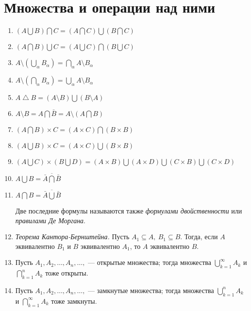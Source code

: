\documentclass[a4paper,12pt]{scrartcl}
\begin{document}
\section{Множества и операции над ними}
\begin{enumerate}
\item $(A \bigcup B)\bigcap C = (A \bigcap C)\bigcup (B \bigcap C)$
\item $(A \bigcap B)\bigcup C = (A \bigcup C)\bigcap (B \bigcup C)$
\item $A \setminus (\bigcup\limits_{\alpha} B_\alpha) = \bigcap\limits_{\alpha}A\setminus B_\alpha$
\item $A \setminus (\bigcap\limits_{\alpha} B_\alpha) = \bigcup\limits_{\alpha}A\setminus B_\alpha$
\item $A \bigtriangleup B = (A \setminus B)\bigcup(B \setminus A)$
\item $A \setminus B = A \bigcap \bar B = A \setminus (A \bigcap B)$
\item $(A\bigcap B) \times C = (A\times C)\bigcap(B \times B) $
\item $(A\bigcup B) \times C = (A\times C)\bigcup(B \times B)$
\item $(A\bigcup C)\times(B\bigcup D) = (A \times B)\bigcup(A \times D)\bigcup(C \times B)\bigcup(C \times D)$
\item $A \bigcup B= \overline{\bar A \bigcap \bar B}$
\item $A \bigcap B= \overline{\bar A \bigcup \bar B}$

Две последние формулы называются также \emph{формулами двойственности} или \emph{правилами Де Моргана}.
\item \textit{Теорема Кантора-Бернштейна.} Пусть $A_1 \subseteq A,\ B_1 \subseteq B$. Тогда, если $A$ эквивалентно $B_1$ и $B$ эквивалентно $A_1$, то $A$ эквивалентно $B$.
\item Пусть $A_1,A_2,\ldots,A_n,\ldots,$  --- открытые множества; тогда множества $\bigcup\limits_{k=1}^{\infty}A_k$ и $\bigcap\limits_{k=1}^{n}A_k$ тоже открыты.
\item Пусть $A_1,A_2,\ldots,A_n,\ldots,$  --- замкнутые множества; тогда множества $\bigcup\limits_{k=1}^{n}A_k$ и $\bigcap\limits_{k=1}^{\infty}A_k$ тоже замкнуты.
\end{enumerate}
\end{document}
